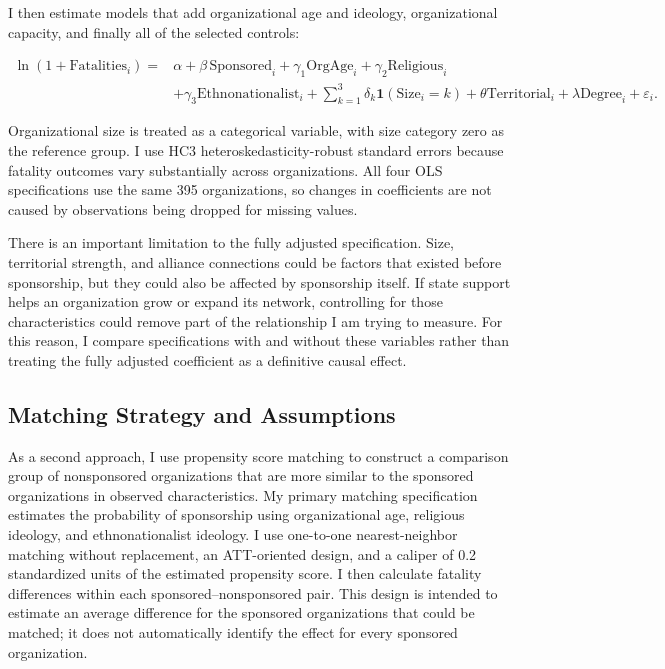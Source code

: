 \documentclass{article}
\begin{document}
I then estimate models that add organizational age and ideology, organizational capacity, and finally all of the selected controls:

\begin{align}
\ln(1+\mathrm{Fatalities}_i) ={}& \alpha+\beta\,\mathrm{Sponsored}_i
+\gamma_1\mathrm{OrgAge}_i
+\gamma_2\mathrm{Religious}_i \\
&+\gamma_3\mathrm{Ethnonationalist}_i
+\sum_{k=1}^{3}\delta_k\mathbf{1}(\mathrm{Size}_i=k)
+\theta\mathrm{Territorial}_i
+\lambda\mathrm{Degree}_i+\varepsilon_i.
\end{align}

Organizational size is treated as a categorical variable, with size category zero as the reference group. I use HC3 heteroskedasticity-robust standard errors because fatality outcomes vary substantially across organizations. All four OLS specifications use the same 395 organizations, so changes in coefficients are not caused by observations being dropped for missing values.

There is an important limitation to the fully adjusted specification. Size, territorial strength, and alliance connections could be factors that existed before sponsorship, but they could also be affected by sponsorship itself. If state support helps an organization grow or expand its network, controlling for those characteristics could remove part of the relationship I am trying to measure. For this reason, I compare specifications with and without these variables rather than treating the fully adjusted coefficient as a definitive causal effect.

\subsection{Matching Strategy and Assumptions}

As a second approach, I use propensity score matching to construct a comparison group of nonsponsored organizations that are more similar to the sponsored organizations in observed characteristics. My primary matching specification estimates the probability of sponsorship using organizational age, religious ideology, and ethnonationalist ideology. I use one-to-one nearest-neighbor matching without replacement, an ATT-oriented design, and a caliper of 0.2 standardized units of the estimated propensity score. I then calculate fatality differences within each sponsored--nonsponsored pair. This design is intended to estimate an average difference for the sponsored organizations that could be matched; it does not automatically identify the effect for every sponsored organization.
\end{document}
